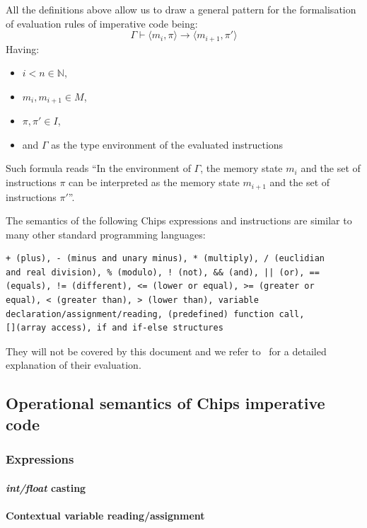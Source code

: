 \documentclass{article}
\newenvironment{myitemize}
{ \begin{itemize}
    \setlength{\itemsep}{0pt}
    \setlength{\parskip}{0pt}
    \setlength{\parsep}{0pt}     }
{ \end{itemize}                  }
\begin{document}
All the definitions above allow us to draw a general pattern for the formalisation of evaluation rules of imperative code being:
\[
\Gamma \vdash \langle m_i, \pi \rangle \rightarrow \langle m_{i+1}, \pi' \rangle
\]
Having:
\begin{myitemize}
    \item[] $i < n \in \mathbb{N}$,
    \item[] $m_i, m_{i+1} \in M$,
    \item[] $\pi, \pi' \in I$,
    \item[] and $\Gamma$ as the type environment of the evaluated instructions
\end{myitemize}

Such formula reads ``In the environment of $\Gamma$, the memory state $m_i$ and the set of instructions $\pi$ can be interpreted as the memory state $m_{i+1}$ and the set of instructions $\pi'$''.

The semantics of the following Chips expressions and instructions are similar to many other standard programming languages:
\begin{verbatim}
+ (plus), - (minus and unary minus), * (multiply), / (euclidian 
and real division), % (modulo), ! (not), && (and), || (or), == 
(equals), != (different), <= (lower or equal), >= (greater or 
equal), < (greater than), > (lower than), variable 
declaration/assignment/reading, (predefined) function call,
[](array access), if and if-else structures\end{verbatim}
They will not be covered by this document and we refer to~\cite{plotkin1981structural} for a detailed explanation of their evaluation.


\subsection{Operational semantics of Chips imperative code}\label{componentsos}

\subsubsection{Expressions}

\paragraph{\emph{int/float} casting}
\paragraph{Contextual variable reading/assignment}
\end{document}
